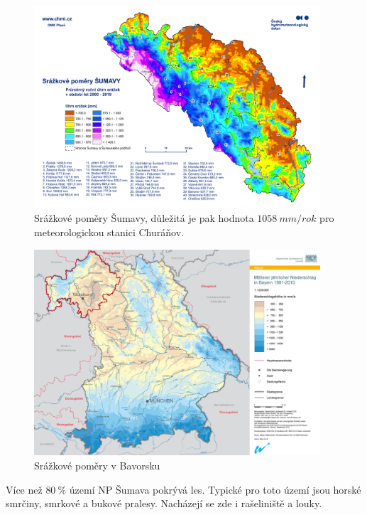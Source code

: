 \begin{figure}
	\centering
	\includegraphics[width=0.95\textwidth]{img/ch1/srazkovepomerysumava.png}
	\caption{Srážkové poměry Šumavy\cite{srazkovepomerysumava}, důležitá je pak hodnota $\SI{1058}{mm/rok}$ pro meteorologickou stanici Churáňov.}
	\label{fig:srazkovepomerysumava}
\end{figure}

\begin{figure}
	\centering
	\includegraphics[width=0.95\textwidth]{img/ch1/srazkovepomerybavorskyles.png}
	\caption{Srážkové poměry v Bavorsku\cite{srazkovepomerybavorskyles}}
	\label{fig:srazkovepomerybavorskyles}
\end{figure}

Více než $\SI{80}{\%}$ území NP Šumava pokrývá les. Typické pro toto území jsou horské smrčiny, smrkové a bukové pralesy. Nacházejí se zde i rašeliniště a louky.

